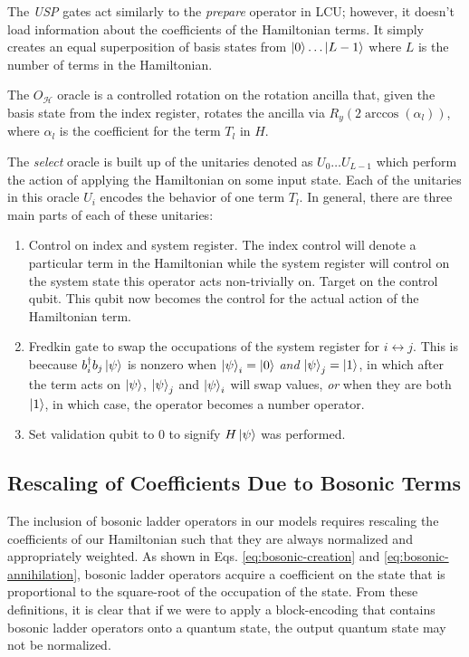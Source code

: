 The \textit{USP} gates act similarly to the \textit{prepare} operator in LCU; however, it doesn't load information about the coefficients of the Hamiltonian terms. It simply creates an equal superposition of basis states from $\ket{0}\dots \ket{L - 1}$ where $L$ is the number of terms in the Hamiltonian. 

The $O_\mathcal{H}$ oracle is a controlled rotation on the rotation ancilla that, given the basis state from the index register, rotates the ancilla via $R_y\left(2\arccos(\alpha_l) \right)$, where $\alpha_l$ is the coefficient for the term $T_l$ in $H$. 

The \textit{select} oracle is built up of the unitaries denoted as $U_0 \dots U_{L - 1}$ which perform the action of applying the Hamiltonian on some input state. Each of the unitaries in this oracle $U_i$ encodes the behavior of one term $T_l$. In general, there are three main parts of each of these unitaries: 
\begin{enumerate}
    \item Control on index and system register. The index control will denote a particular term in the Hamiltonian while the system register will control on the system state this operator acts non-trivially on. Target on the control qubit. This qubit now becomes the control for the actual action of the Hamiltonian term.
    \item Fredkin gate to swap the occupations of the system register for $i \leftrightarrow j$. This is beecause $b^\dagger_i b_j \ket{\psi}$ is nonzero when $\ket{\psi}_i = \ket{0}$ \textit{and} $\ket{\psi}_j = \ket{1}$, in which after the term acts on $\ket{\psi}$, $\ket{\psi}_j$ and $\ket{\psi}_i$ will swap values,  \textit{or} when they are both $\ket{1}$, in which case, the operator becomes a number operator.
    \item Set validation qubit to $0$ to signify $H\ket{\psi}$ was performed. 
\end{enumerate}

\subsection{Rescaling of Coefficients Due to Bosonic Terms}
\label{subsec:rescaling}

The inclusion of bosonic ladder operators in our models requires rescaling the coefficients of our Hamiltonian such that they are always normalized and appropriately weighted.
As shown in Eqs. \ref{eq:bosonic-creation} and \ref{eq:bosonic-annihilation}, bosonic ladder operators acquire a coefficient on the state that is proportional to the square-root of the occupation of the state.
From these definitions, it is clear that if we were to apply a block-encoding that contains bosonic ladder operators onto a quantum state, the output quantum state may not be normalized.

